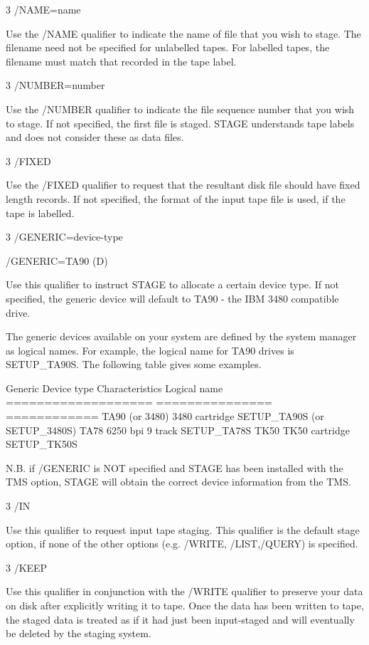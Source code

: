 \begin{XMP}
3 /NAME=name

Use the /NAME qualifier to indicate the name of file that you wish
to stage. The filename need not be specified for unlabelled tapes. For
labelled tapes, the filename must match that recorded in the tape label.

3 /NUMBER=number

Use the /NUMBER qualifier to indicate the file sequence number that
you wish to stage. If not specified, the first file is staged. STAGE
understands tape labels and does not consider these as data files.

3 /FIXED

Use the /FIXED qualifier to request that the resultant disk file should
have fixed length records. If not specified, the format of the input tape
file is used, if the tape is labelled.


3 /GENERIC=device-type

   /GENERIC=TA90 (D)

 Use this qualifier to instruct STAGE to allocate a certain
 device type. If not specified, the generic device will default to
 TA90 - the IBM 3480 compatible drive.

 The generic devices available on your system are defined by the system
 manager as logical names. For example, the logical name for TA90 drives
 is SETUP_TA90S. The following table gives some examples.

 Generic Device type     Characteristics     Logical name
 ===================     ===============     ============
 TA90 (or 3480)          3480 cartridge      SETUP_TA90S (or SETUP_3480S)
 TA78                    6250 bpi 9 track    SETUP_TA78S
 TK50                    TK50 cartridge      SETUP_TK50S

 N.B. if /GENERIC is NOT specified and STAGE has been installed with
 the TMS option, STAGE will obtain the correct device information from
 the TMS.

3 /IN

Use this qualifier to request input tape staging. This qualifier is
the default stage option, if none of the other options (e.g. /WRITE,
 /LIST,/QUERY) is specified.

3 /KEEP

Use this qualifier in conjunction with the /WRITE qualifier to preserve
your data on disk after explicitly writing it to tape. Once the data
has been written to tape, the staged data is treated as if it had
just been input-staged and will eventually be deleted by the staging
system.


\end{XMP}
